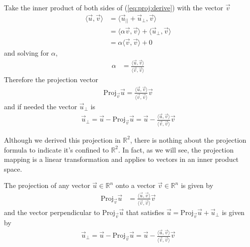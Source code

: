 Take the inner product of both sides of (\ref{eq:proj:derive}) with the vector $\vec{v}$ 
\begin{align*}
\langle \vec{u}, \vec{v} \rangle & = \langle \vec{u}_{||} + \vec{u}_{\perp}, \vec{v} \rangle \\
& = \langle \alpha \vec{v}, \vec{v} \rangle + \langle \vec{u}_{\perp}, \vec{v} \rangle \\
& = \alpha \langle \vec{v},\vec{v} \rangle + 0 
\end{align*}
and solving for $\alpha$, 
%
\begin{align*}
\alpha & = \frac{ \langle \vec{u}, \vec{v} \rangle}{\langle \vec{v}, \vec{v} \rangle}  
\end{align*}
Therefore the projection vector
%
\begin{align} \label{eq:proj:vector}
\text{Proj}_{\vec{v}} \vec{u} = \frac{ \langle \vec{u}, \vec{v} \rangle}{\langle \vec{v}, \vec{v} \rangle}  \vec{v} 
\end{align}
and if needed the vector $\vec{u}_{\perp}$ is 
%
\begin{align*}
\vec{u}_{\perp} = \vec{u} - \text{Proj}_{\vec{v}} \vec{u} = \vec{u} - \frac{ \langle \vec{u}, \vec{v} \rangle}{\langle \vec{v}, \vec{v} \rangle}  \vec{v} 
\end{align*}

Although we derived this projection in $\mathbb{R}^2$, there is nothing about the projection formula to indicate it's confined to $\mathbb{R}^2$.  In fact, as we will see, the projection mapping is a linear transformation and applies to vectors in an inner product space.   

\begin{Boxed*}
The projection of any vector $\vec{u} \in \mathbb{R}^n$ onto a vector $\vec{v} \in \mathbb{R}^n$ is given by
%
\begin{align*}
\text{Proj}_{\vec{v}} \vec{u} & = \frac{\langle \vec{u},\vec{v} \rangle}{\langle \vec{v}, \vec{v} \rangle} \vec{v}
\end{align*}
and the vector perpendicular to $\text{Proj}_{\vec{v}}\vec{u}$ that satisfies $\vec{u} = \text{Proj}_{\vec{v}}\vec{u} + \vec{u}_{\perp}$ is given by 
%
\begin{align*}
\vec{u}_{\perp} = \vec{u} - \text{Proj}_{\vec{v}} \vec{u} = \vec{u} - \frac{ \langle \vec{u}, \vec{v} \rangle}{\langle \vec{v}, \vec{v} \rangle}  \vec{v} 
\end{align*}

\end{Boxed*}



